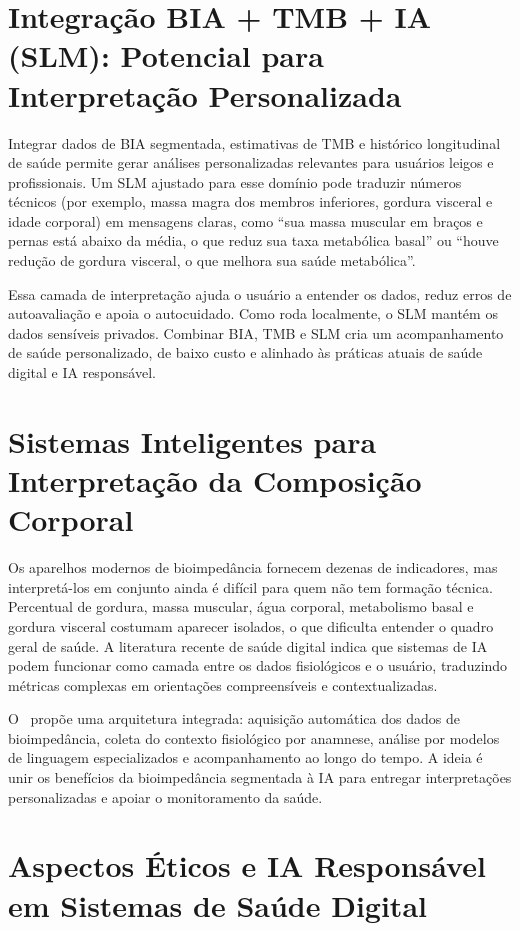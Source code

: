 \section{Integração BIA + TMB + IA (SLM): Potencial para Interpretação Personalizada}

Integrar dados de BIA segmentada, estimativas de TMB e histórico longitudinal de saúde
permite gerar análises personalizadas relevantes para usuários leigos e profissionais. Um
SLM ajustado para esse domínio pode traduzir números técnicos (por exemplo, massa magra
dos membros inferiores, gordura visceral e idade corporal) em mensagens claras, como
``sua massa muscular em braços e pernas está abaixo da média, o que reduz sua taxa
metabólica basal'' ou ``houve redução de gordura visceral, o que melhora sua saúde
metabólica''.

Essa camada de interpretação ajuda o usuário a entender os dados, reduz erros de
autoavaliação e apoia o autocuidado. Como roda localmente, o SLM mantém os dados sensíveis
privados. Combinar BIA, TMB e SLM cria um acompanhamento de saúde personalizado, de baixo
custo e alinhado às práticas atuais de saúde digital e IA responsável.

\section{Sistemas Inteligentes para Interpretação da Composição Corporal}

Os aparelhos modernos de bioimpedância fornecem dezenas de indicadores, mas interpretá-los
em conjunto ainda é difícil para quem não tem formação técnica. Percentual de gordura,
massa muscular, água corporal, metabolismo basal e gordura visceral costumam aparecer
isolados, o que dificulta entender o quadro geral de saúde. A literatura recente de saúde
digital indica que sistemas de IA podem funcionar como camada entre os dados fisiológicos
e o usuário, traduzindo métricas complexas em orientações compreensíveis e
contextualizadas.

O \sintonia\ propõe uma arquitetura integrada: aquisição automática dos dados de
bioimpedância, coleta do contexto fisiológico por anamnese, análise por modelos de
linguagem especializados e acompanhamento ao longo do tempo. A ideia é unir os benefícios
da bioimpedância segmentada à IA para entregar interpretações personalizadas e apoiar o
monitoramento da saúde.

\section{Aspectos Éticos e IA Responsável em Sistemas de Saúde Digital}

